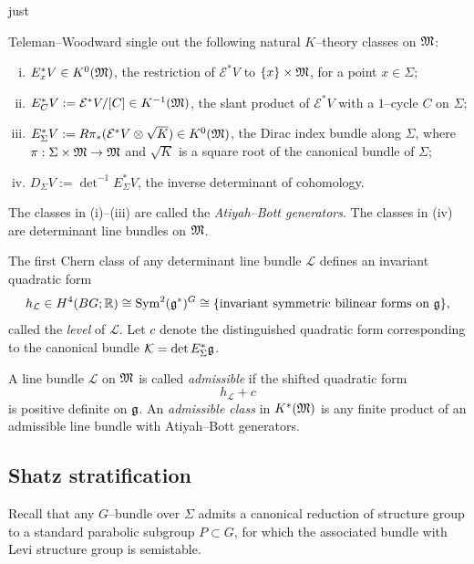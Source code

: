just \documentclass[12pt]{article}
\begin{document}
Teleman--Woodward single out the following natural $K$--theory classes on $\mathfrak{M}$:

\begin{enumerate}[(i)]
\item $E_x^*V\in K^0(\mathfrak{M})$, the restriction of $\mathcal E^*V$ to $\{x\}\times\mathfrak{M}$,
for a point $x\in\Sigma$;

\item $E_C^*V := \mathcal E^*V/[C]\in K^{-1}(\mathfrak{M})$, the slant product of $\mathcal E^*V$
with a $1$--cycle $C$ on $\Sigma$;

\item $E_\Sigma^*V := R\pi_*(\mathcal E^*V\otimes\sqrt K)\in K^0(\mathfrak{M})$, the Dirac index
bundle along $\Sigma$, where $\pi:\Sigma\times\mathfrak{M}\to\mathfrak{M}$ and $\sqrt K$ is a square
root of the canonical bundle of $\Sigma$;

\item $D_\Sigma V := \det^{-1}E_\Sigma^*V$, the inverse determinant of cohomology.
\end{enumerate}

The classes in (i)--(iii) are called the \emph{Atiyah--Bott generators}.  The classes
in (iv) are determinant line bundles on $\mathfrak{M}$.

The first Chern class of any determinant line bundle
$\mathcal L$ defines an invariant quadratic form
\[
h_\mathcal L\in H^4(BG;\mathbb{R})\cong \operatorname{Sym}^2(\mathfrak{g}^*)^G \cong
\{\text{invariant symmetric bilinear forms on }\mathfrak{g}\},
\]
called the \emph{level} of $\mathcal L$.  Let $c$ denote the distinguished quadratic
form corresponding to the canonical bundle
$\mathcal K=\det E_\Sigma^*\mathfrak{g}$.

\begin{definition}
A line bundle $\mathcal L$ on $\mathfrak{M}$ is called \emph{admissible} if the shifted
quadratic form
\[
h_\mathcal L + c
\]
is positive definite on $\mathfrak{g}$. An \emph{admissible class} in $K^*(\mathfrak{M})$ is any finite product of an admissible line
bundle with Atiyah--Bott generators.
\end{definition}

\subsection*{Shatz stratification}

Recall that any $G$--bundle over $\Sigma$ admits a canonical reduction of structure
group to a standard parabolic subgroup $P\subset G$, for which the associated
bundle with Levi structure group is semistable. 
\end{document}
